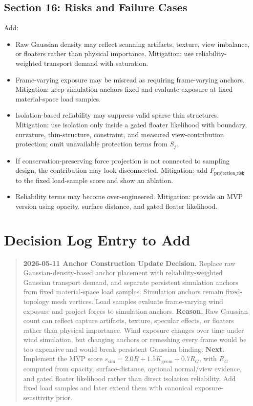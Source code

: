 \documentclass[11pt,a4paper]{article}
\begin{document}
\subsection{Section 16: Risks and Failure Cases}

Add:

\begin{itemize}[leftmargin=2em]
\item Raw Gaussian density may reflect scanning artifacts, texture, view imbalance, or floaters rather than physical importance. Mitigation: use reliability-weighted transport demand with saturation.
\item Frame-varying exposure may be misread as requiring frame-varying anchors. Mitigation: keep simulation anchors fixed and evaluate exposure at fixed material-space load samples.
\item Isolation-based reliability may suppress valid sparse thin structures. Mitigation: use isolation only inside a gated floater likelihood with boundary, curvature, thin-structure, constraint, and measured view-contribution protection; omit unavailable protection terms from $S_j$.
\item If conservation-preserving force projection is not connected to sampling design, the contribution may look disconnected. Mitigation: add $F_{\mathrm{projection\_risk}}$ to the fixed load-sample score and show an ablation.
\item Reliability terms may become over-engineered. Mitigation: provide an MVP version using opacity, surface distance, and gated floater likelihood.
\end{itemize}

\section{Decision Log Entry to Add}

\begin{quote}
\textbf{2026-05-11 Anchor Construction Update}\newline
\textbf{Decision.} Replace raw Gaussian-density-based anchor placement with reliability-weighted Gaussian transport demand, and separate persistent simulation anchors from fixed material-space load samples. Simulation anchors remain fixed-topology mesh vertices. Load samples evaluate frame-varying wind exposure and project forces to simulation anchors.\newline
\textbf{Reason.} Raw Gaussian count can reflect capture artifacts, texture, specular effects, or floaters rather than physical importance. Wind exposure changes over time under wind simulation, but changing anchors or remeshing every frame would be too expensive and would break persistent Gaussian binding.\newline
\textbf{Next.} Implement the MVP score $s_{\mathrm{sim}}=2.0B+1.5K_{\mathrm{geom}}+0.7R_G$, with $R_G$ computed from opacity, surface-distance, optional normal/view evidence, and gated floater likelihood rather than direct isolation reliability. Add fixed load samples and later extend them with canonical exposure-sensitivity prior.
\end{quote}
\end{document}
